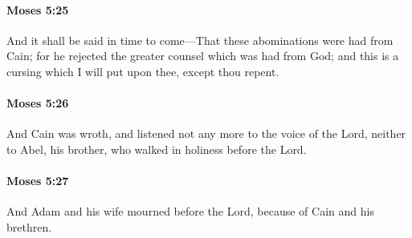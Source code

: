 		\paragraph{Moses 5:25} %
			\label{MOSES-5-25}

			And it shall be said in time to come---That these abominations were had from Cain; for he rejected the greater counsel which was had from God; and this is a cursing which I will put upon thee, except thou repent.


		\paragraph{Moses 5:26} %
			\label{MOSES-5-26}

			And Cain was wroth, and listened not any more to the voice of the Lord, neither to Abel, his brother, who walked in holiness before the Lord.


		\paragraph{Moses 5:27} %
			\label{MOSES-5-27}

			And Adam and his wife mourned before the Lord, because of Cain and his brethren.


